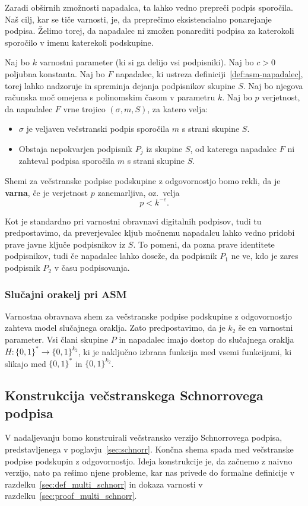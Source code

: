 \documentclass[isrm2, tisk]{fmfdelo}
\begin{document}
Zaradi obširnih zmožnosti napadalca, ta lahko vedno prepreči podpis sporočila. Naš cilj, kar se
tiče varnosti, je, da preprečimo eksistencialno ponarejanje podpisa. Želimo torej, da napadalec ni
zmožen ponarediti podpisa za katerokoli sporočilo v imenu katerekoli podskupine.

\begin{definicija}
\label{def:asm-varnost}
    Naj bo $k$ varnostni parameter (ki si ga delijo vsi podpisniki). Naj bo $c > 0$ poljubna konstanta. 
    Naj bo $F$ napadalec, ki ustreza definiciji~\ref{def:asm-napadalec}, torej lahko nadzoruje in
    spreminja dejanja podpisnikov skupine $S$. Naj bo njegova računska moč omejena s polinomskim časom
    v parametru $k$. Naj bo $p$ verjetnost, da napadalec $F$ vrne trojico $(\sigma, m, S)$, za katero velja: 
    \begin{itemize}
        \item $\sigma$ je veljaven večstranski podpis sporočila $m$ s strani skupine $S$.
        \item Obstaja nepokvarjen podpisnik $P_j$ iz skupine $S$, od katerega napadalec $F$ ni zahteval podpisa 
            sporočila $m$ s strani skupine $S$.
    \end{itemize}
    Shemi za večstranske 
    podpise podskupine z odgovornostjo bomo rekli, da je \textbf{varna}, če je verjetnost $p$ zanemarljiva,
    oz.\ velja
    $$ 
    p < k^{-c}.
    $$
\end{definicija}

Kot je standardno pri varnostni obravnavi digitalnih podpisov, tudi tu predpostavimo, da preverjevalec
kljub močnemu napadalcu lahko vedno pridobi prave javne ključe podpisnikov iz $S$. To pomeni, da
pozna prave identitete podpisnikov, tudi če napadalec lahko doseže, da podpisnik $P_1$ ne ve, kdo
je zares podpisnik $P_2$ v času podpisovanja.

\subsubsection{Slučajni orakelj pri ASM}
Varnostna obravnava shem za večstranske podpise podskupine z odgovornostjo zahteva model slučajnega 
oraklja. Zato predpostavimo, da je $k_2$ še en varnostni parameter. Vsi člani skupine $P$ in 
napadalec imajo dostop do slučajnega oraklja $H: \{0, 1\}^* \rightarrow \{0, 1\}^{k_2}$, ki je 
naključno izbrana funkcija med vsemi funkcijami, ki slikajo med $\{0, 1\}^*$ in $\{0, 1\}^{k_2}$.

\subsection{Konstrukcija večstranskega Schnorrovega podpisa}
V nadaljevanju bomo konstruirali večstransko verzijo Schnorrovega podpisa, predstavljenega v
poglavju~\ref{sec:schnorr}. Končna shema spada med večstranske podpise podskupin z odgovornostjo.
Ideja konstrukcije je, da začnemo z naivno verzijo, nato pa rešimo njene probleme, kar nas
privede do formalne definicije v razdelku~\ref{sec:def_multi_schnorr} in dokaza varnosti v
razdelku~\ref{sec:proof_multi_schnorr}.
\end{document}
